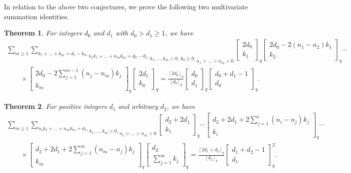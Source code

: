 \documentclass[10pt,a4paper]{amsart}
\newtheorem{Theorem}{Theorem}
\begin{document}
In relation to the above two conjectures, we prove the following
two multivariate summation identities.


\begin{Theorem} \label{TA}
For integers $d_0$ and $d_1$ with $d_0>d_1\ge1$, we have
\begin{gather}
\sum_{m\ge1}
\underset{n_1>\dots>n_m>0}
{
\underset{k_1,\dots,k_m>0,\,k_0\ge0,}
{
\underset{n_1k_1+\dots+n_mk_m=d_0-d_1,}
{\sum_{k_1+\dots+k_m=d_1-k_0,}}}}
\begin{bmatrix} 2d_0\\k_1\end{bmatrix}_q
\begin{bmatrix} 2d_0-2(n_1-n_2)k_1\\k_2\end{bmatrix}_q\cdots\nonumber\\
\qquad{}\times
\begin{bmatrix} 2d_0-2\sum_{j=1}^{m-1}(n_j-n_m)k_j\\k_m\end{bmatrix}_q
\begin{bmatrix} 2d_1\\k_0\end{bmatrix}_q
=\frac {[2d_0]_q} {[d_0]_q}
\begin{bmatrix} d_0\\d_1\end{bmatrix}_q
\begin{bmatrix} d_0+d_1-1\\d_0\end{bmatrix}_q.
\label{AF}
\end{gather}
\end{Theorem}



\begin{Theorem} \label{TB}
For positive integers $d_1$ and arbitrary $d_2$, we have
\begin{gather}
\sum_{m\ge1}
\underset{n_1>\dots>n_m>0}
{
\underset{k_1,\dots,k_m>0,}
{\sum_{n_1k_1+\dots+n_mk_m=d_1,}}}
\begin{bmatrix} d_2+2d_1\\k_1\end{bmatrix}_q
\cdots
\begin{bmatrix} d_2+2d_1+2\sum_{j=1}^{i}(n_{i}-n_{j})k_{j}\\k_{i}\end{bmatrix}_q \cdots\nonumber\\
\qquad{}\times
\begin{bmatrix} d_2+2d_1+2\sum_{j=1}^{m}(n_{m}-n_{j})k_{j}\\k_{m}\end{bmatrix}_q
\begin{bmatrix} d_2\\\sum_{j=1}^mk_{j}\end{bmatrix}_q
\!=
\frac {[2d_1+d_2]_q} {[d_2]_q}\begin{bmatrix} d_1+d_2-1\\d_1\end{bmatrix}_q^2.
\label{AG}
\end{gather}
\end{Theorem}
\end{document}
